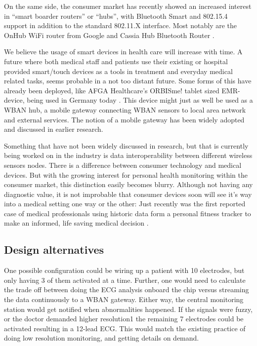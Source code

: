 On the same side, the consumer market has recently showed an increased interest in ``smart boarder routers'' or ``hubs'', with Bluetooth Smart and 802.15.4 support in addition to the standard 802.11.X interface. Most notably are the OnHub WiFi router from Google \cite{newRef:60} and Cassia Hub Bluetooth Router \cite{newRef:61}.

We believe the usage of smart devices in health care will increase with time. A future where both medical staff and patients use their existing or hospital provided smart/touch devices as a tools in treatment and everyday medical related tasks, seems probable in a not too distant future. Some forms of this have already been deployed, like AFGA Healthcare's ORBISme! tablet sized EMR-device, being used in Germany today \cite{newRef:271}. This device might just as well be used as a WBAN hub, a mobile gateway connecting WBAN sensors to local area network and external services. The notion of a mobile gateway has been widely adopted and discussed \cite{Movassaghi:2014hi, Mohammed:2014dw, Touati:2015gy, EmilJovanov:2005ty} in earlier research.

Something that have not been widely discussed in research, but that is currently being worked on in the industry is data interoperability between different wireless sensors nodes. There is a difference between consumer technology and medical devices. But with the growing interest for personal health monitoring within the consumer market, this distinction easily becomes blurry. Although not having any diagnostic value, it is not improbable that consumer devices soon will see it's way into a medical setting one way or the other: Just recently was the first reported case of medical professionals using historic data form a personal fitness tracker to make an informed, life saving medical decision \cite{newRef:29}.


\subsection{Design alternatives} %
\label{sub:design_alternatives}

One possible configuration could be wiring up a patient with 10 electrodes, but only having 3 of them activated at a time. Further, one would need to calculate the trade off between doing the ECG analysis onboard the chip versus streaming the data continuously to a WBAN gateway. Either way, the central monitoring station would get notified when abnormalities happened. If the signals were fuzzy, or the doctor demanded higher resolution{1} the remaining 7 electrodes could be activated resulting in a 12-lead ECG. This would match the existing practice of doing low resolution monitoring, and getting details on demand.

